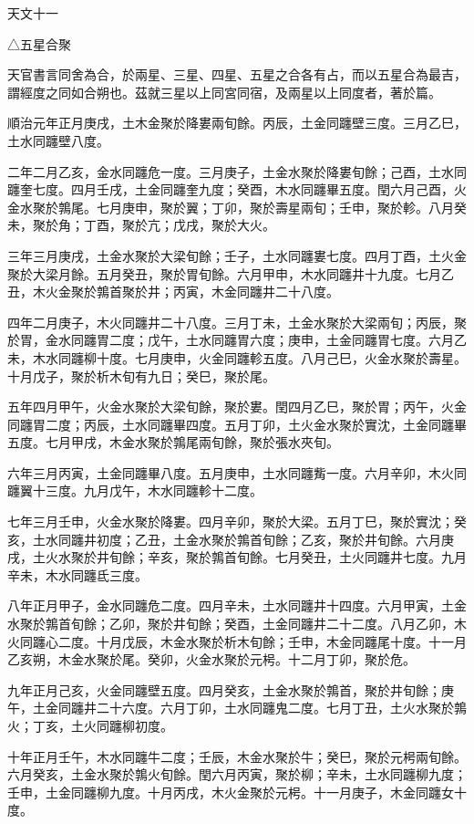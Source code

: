 
\begin{pinyinscope}
天文十一

△五星合聚

天官書言同舍為合，於兩星、三星、四星、五星之合各有占，而以五星合為最吉，謂經度之同如合朔也。茲就三星以上同宮同宿，及兩星以上同度者，著於篇。

順治元年正月庚戌，土木金聚於降婁兩旬餘。丙辰，土金同躔壁三度。三月乙巳，土水同躔壁八度。

二年二月乙亥，金水同躔危一度。三月庚子，土金水聚於降婁旬餘；己酉，土水同躔奎七度。四月壬戌，土金同躔奎九度；癸酉，木水同躔畢五度。閏六月己酉，火金水聚於鶉尾。七月庚申，聚於翼；丁卯，聚於壽星兩旬；壬申，聚於軫。八月癸未，聚於角；丁酉，聚於亢；戊戌，聚於大火。

三年三月庚戌，土金水聚於大梁旬餘；壬子，土水同躔婁七度。四月丁酉，土火金聚於大梁月餘。五月癸丑，聚於胃旬餘。六月甲申，木水同躔井十九度。七月乙丑，木火金聚於鶉首聚於井；丙寅，木金同躔井二十八度。

四年二月庚子，木火同躔井二十八度。三月丁未，土金水聚於大梁兩旬；丙辰，聚於胃，金水同躔胃二度；戊午，土水同躔胃六度；庚申，土金同躔胃七度。六月乙未，木水同躔柳十度。七月庚申，火金同躔軫五度。八月己巳，火金水聚於壽星。十月戊子，聚於析木旬有九日；癸巳，聚於尾。

五年四月甲午，火金水聚於大梁旬餘，聚於婁。閏四月乙巳，聚於胃；丙午，火金同躔胃二度；丙辰，土水同躔畢四度。五月丁卯，土火金水聚於實沈，土金同躔畢五度。七月甲戌，木金水聚於鶉尾兩旬餘，聚於張水夾旬。

六年三月丙寅，土金同躔畢八度。五月庚申，土水同躔觜一度。六月辛卯，木火同躔翼十三度。九月戊午，木水同躔軫十二度。

七年三月壬申，火金水聚於降婁。四月辛卯，聚於大梁。五月丁巳，聚於實沈；癸亥，土水同躔井初度；乙丑，土金水聚於鶉首旬餘；乙亥，聚於井旬餘。六月庚戌，土火水聚於井旬餘；辛亥，聚於鶉首旬餘。七月癸丑，土火同躔井七度。九月辛未，木水同躔氐三度。

八年正月甲子，金水同躔危二度。四月辛未，土水同躔井十四度。六月甲寅，土金水聚於鶉首旬餘；乙卯，聚於井旬餘；癸酉，土金同躔井二十二度。八月乙卯，木火同躔心二度。十月戊辰，木金水聚於析木旬餘；壬申，木金同躔尾十度。十一月乙亥朔，木金水聚於尾。癸卯，火金水聚於元枵。十二月丁卯，聚於危。

九年正月己亥，火金同躔壁五度。四月癸亥，土金水聚於鶉首，聚於井旬餘；庚午，土金同躔井二十六度。六月丁卯，土水同躔鬼二度。七月丁丑，土火水聚於鶉火；丁亥，土火同躔柳初度。

十年正月壬午，木水同躔牛二度；壬辰，木金水聚於牛；癸巳，聚於元枵兩旬餘。六月癸亥，土金水聚於鶉火旬餘。閏六月丙寅，聚於柳；辛未，土水同躔柳九度；壬申，土金同躔柳九度。十月丙戌，木火金聚於元枵。十一月庚子，木金同躔女十度。


\end{pinyinscope}
